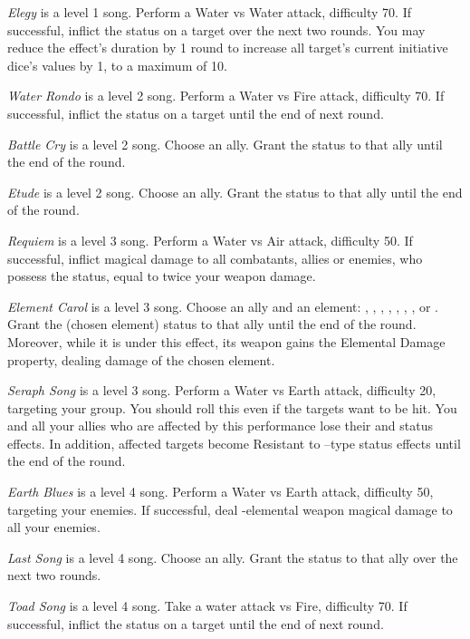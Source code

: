 \begin{multicols}{2}
    \textit{Elegy} is a level 1 song. Perform a Water vs Water attack, difficulty 70. If successful, inflict the  status on a target over the next two rounds. You may reduce the effect's duration by 1 round to increase all target's current initiative dice's values by 1, to a maximum of 10.
    
    \textit{Water Rondo} is a level 2 song. Perform a Water vs Fire attack, difficulty 70. If successful, inflict the  status on a target until the end of next round.
    
    \textit{Battle Cry} is a level 2 song. Choose an ally. Grant the  status to that ally until the end of the round.
    
    \textit{Etude} is a level 2 song. Choose an ally. Grant the  status to that ally until the end of the round.
    
    \textit{Requiem} is a level 3 song. Perform a Water vs Air attack, difficulty 50. If successful, inflict magical damage to all combatants, allies or enemies, who possess the  status, equal to twice your weapon damage.
    
    \textit{Element Carol} is a level 3 song. Choose an ally and an element: , , , , , , ,  or . Grant the  (chosen element) status to that ally until the end of the round. Moreover, while it is under this effect, its weapon gains the Elemental Damage property, dealing damage of the chosen element.
    
    \textit{Seraph Song} is a level 3 song. Perform a Water vs Earth attack, difficulty 20, targeting your group. You should roll this even if the targets want to be hit. You and all your allies who are affected by this performance lose their  and  status effects. In addition, affected targets become Resistant to –type status effects until the end of the round.

    \textit{Earth Blues} is a level 4 song. Perform a Water vs Earth attack, difficulty 50, targeting your enemies. If successful, deal -elemental weapon magical damage to all your enemies.
    
    \textit{Last Song} is a level 4 song. Choose an ally. Grant the  status to that ally over the next two rounds.
    
    \textit{Toad Song} is a level 4 song. Take a water attack vs Fire, difficulty 70. If successful, inflict the  status on a target until the end of next round.
    

\end{multicols}
